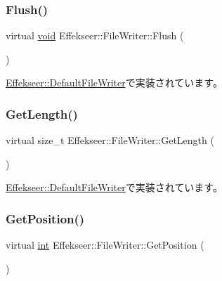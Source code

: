 \subsubsection{\texorpdfstring{Flush()}{Flush()}}
{\footnotesize\ttfamily virtual \mbox{\hyperlink{namespace_effekseer_ab34c4088e512200cf4c2716f168deb56}{void}} Effekseer\+::\+File\+Writer\+::\+Flush (\begin{DoxyParamCaption}{ }\end{DoxyParamCaption})\hspace{0.3cm}{\ttfamily [pure virtual]}}



\mbox{\hyperlink{class_effekseer_1_1_default_file_writer_a3b652725044e257665b48de729e79094}{Effekseer\+::\+Default\+File\+Writer}}で実装されています。

\mbox{\label{class_effekseer_1_1_file_writer_a6baf95dec7700d2c7a5e71c6c4f76724}} 
\subsubsection{\texorpdfstring{Get\+Length()}{GetLength()}}
{\footnotesize\ttfamily virtual size\+\_\+t Effekseer\+::\+File\+Writer\+::\+Get\+Length (\begin{DoxyParamCaption}{ }\end{DoxyParamCaption})\hspace{0.3cm}{\ttfamily [pure virtual]}}



\mbox{\hyperlink{class_effekseer_1_1_default_file_writer_a6745621cb9db4dc7d33d89de8aae435e}{Effekseer\+::\+Default\+File\+Writer}}で実装されています。

\mbox{\label{class_effekseer_1_1_file_writer_a656bbee191e65ccc63791d5c41c6e853}} 
\subsubsection{\texorpdfstring{Get\+Position()}{GetPosition()}}
{\footnotesize\ttfamily virtual \mbox{\hyperlink{namespace_effekseer_ace0abf7c2e6947e519ebe8b54cbcc30a}{int}} Effekseer\+::\+File\+Writer\+::\+Get\+Position (\begin{DoxyParamCaption}{ }\end{DoxyParamCaption})\hspace{0.3cm}{\ttfamily [pure virtual]}}




